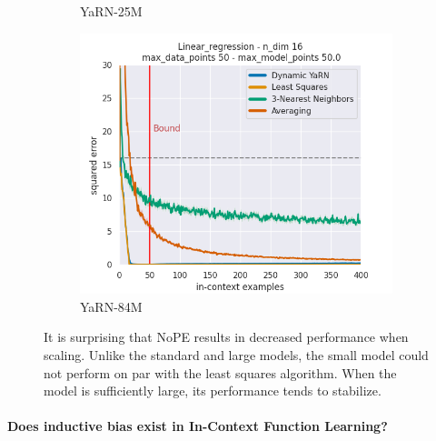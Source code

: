 \documentclass[letterpaper]{article} %
\begin{document}
\begin{figure}[tp]
\begin{subfigure}[t]{0.32\linewidth}
        \caption{YaRN-25M}
    \end{subfigure}
    \begin{subfigure}[t]{0.32\linewidth}
        \includegraphics[width=\linewidth]{AnonymousSubmission/LaTeX/imgs/analysis/large-dynamic-yarn.png}
        \caption{YaRN-84M}
    \end{subfigure}
    \caption{It is surprising that NoPE results in decreased performance when scaling. Unlike the standard and large models, the small model could not perform on par with the least squares algorithm. When the model is sufficiently large, its performance tends to stabilize.}
    \label{fig:scaling}
\end{figure}

\paragraph{Does inductive bias exist in In-Context Function Learning?}
\end{document}
